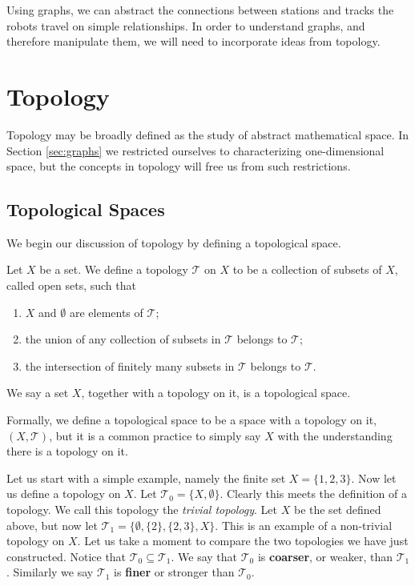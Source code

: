\documentclass[12pt,oneside]{amsbook}
\newenvironment{defn}[1][Definition.]{\begin{trivlist}
\item[\hskip \labelsep {\bfseries #1}]}{\end{trivlist}}
\newcommand{\T}{\mathcal{T}}
\begin{document}
Using graphs, we can abstract the connections between stations and tracks the robots travel on simple relationships. In order to understand graphs, and therefore manipulate them, we will need to incorporate ideas from topology.


\section{Topology}\label{sec:topology}
Topology may be broadly defined as the study of abstract mathematical space. In Section \ref{sec:graphs} we restricted ourselves to characterizing one-dimensional space, but the concepts in topology will free us from such restrictions. 

\subsection{Topological Spaces}

We begin our discussion of topology by defining a topological space.
\begin{defn}
Let $X$ be a set. We define a topology $\mathcal{T}$ on $X$ to be a collection of subsets of $X$, called open sets, such that
\begin{enumerate}
\item $X$ and $\emptyset$ are elements of $\mathcal{T}$;\
\item the union of any collection of subsets in $\T$ belongs to $\T$;\
\item the intersection of finitely many subsets in $\T$ belongs to $\T$.
\end{enumerate}
We say a set $X$, together with a topology on it, is a topological space.
\end{defn}


Formally, we define a topological space to be a space with a topology on it, $(X,\mathcal{T})$, but it is a common practice to simply say $X$ with the understanding there is a topology on it.

Let us start with a simple example, namely the finite set $X=\{1,2,3\}$. Now let us define a topology on $X$. Let $\mathcal{T}_0=\{X,\emptyset\}$. Clearly this meets the definition of a topology. We call this topology the \textit{trivial topology}. Let $X$ be the set defined above, but now let $\mathcal{T}_1=\{\emptyset, \{2\}, \{2,3\}, X\}$. This is an example of a non-trivial topology on $X$. Let us take a moment to compare the two topologies we have just constructed. Notice that $\mathcal{T}_0 \subseteq \mathcal{T}_1$. We say that $\mathcal{T}_0$ is \textbf{coarser}, or weaker, than $\mathcal{T}_1$. Similarly we say $\mathcal{T}_1$ is \textbf{finer} or stronger than $\mathcal{T}_0$. 
\end{document}
